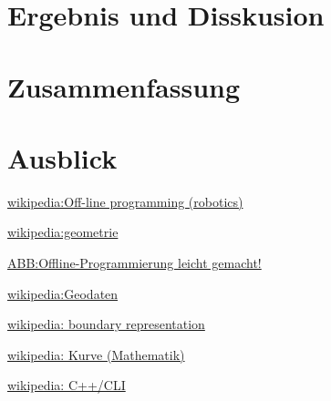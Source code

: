 \documentclass[14pt,a4paper,titlepage]{article}
\begin{document}
	\section{Ergebnis und Disskusion}
	\section{Zusammenfassung}
	\section{Ausblick}
	\pagebreak
	\begin{thebibliography}{1}
		\href{https://en.wikipedia.org/wiki/Off-line_programming_(robotics)}{wikipedia:Off-line programming (robotics)}
		
		\href{https://de.wikipedia.org/wiki/Geometrie}{wikipedia:geometrie}
		
		\href{https://new.abb.com/products/robotics/de/robotstudio}{ABB:Offline-Programmierung leicht gemacht!}
		
		\href{https://de.wikipedia.org/wiki/Geodaten#Topologie}{wikipedia:Geodaten}
		
		\href{https://en.wikipedia.org/wiki/Boundary_representation}{wikipedia: boundary representation}
		
		\href{https://de.wikipedia.org/wiki/Kurve_(Mathematik)}{wikipedia: Kurve (Mathematik)}
		
		\href{https://de.wikipedia.org/wiki/C%2B%2B/CLI}{wikipedia: C++/CLI}
	\end{thebibliography}
	\pagebreak
	\listoffigures
	\pagebreak
\end{document}
